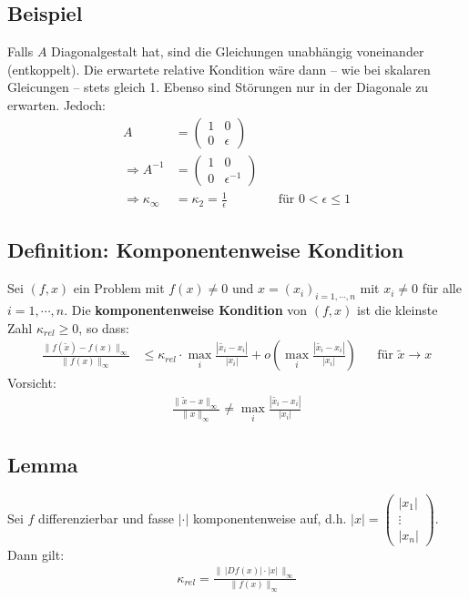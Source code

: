 \documentclass[ngerman,fontsize=11pt, paper=a4, parskip=half, titlepage=true, toc=bib]{scrbook}
\begin{document}
\subsection{Beispiel}
Falls $A$ Diagonalgestalt hat, sind die Gleichungen unabhängig voneinander (entkoppelt).
Die erwartete relative Kondition wäre dann -- wie bei skalaren Gleicungen -- stets gleich 1.
Ebenso sind Störungen nur in der Diagonale zu erwarten. Jedoch:
\begin{align*}
	A  &=\begin{pmatrix}
					1 & 0\\
					0 & \epsilon
				\end{pmatrix} \\
	\Rightarrow 	A^{-1}&=\begin{pmatrix}
													1 & 0\\
													0 & \epsilon^{-1}
												\end{pmatrix}\\
	\Rightarrow \kappa_\infty& = \kappa_2 = \frac{1}{\epsilon} 
													&& \text{für }0 < \epsilon \leq 1											
\end{align*}

\subsection{Definition: Komponentenweise Kondition}
Sei $(f, x) $ ein Problem mit $f(x)\neq 0$ und $x=(x_i)_{i=1,\cdots , n}$ mit $x_i\neq 0 $  für alle $i=1,\cdots, n$.
Die \textbf{komponentenweise Kondition} von $(f,x) $ ist die kleinste Zahl $\kappa_{rel}\geq 0$, so dass:
\begin{align*}
	\frac{\|f(\widetilde{x})-f(x)\|_\infty}{\|f(x)\|_\infty} 
				&\leq \kappa_{rel} \cdot \underset{i}{\max}\frac{|\widetilde{x_i}-x_i|}{|x_i|}+ o\left(\underset{i}{\max}\frac{|\widetilde{x_i}-x_i|}{|x_i|}\right) 
				&& \text{für }\widetilde{x}\rightarrow x
\end{align*}
Vorsicht:
\begin{gather*}
	\frac{\|\widetilde{x}-x\|_\infty}{\|x\|_\infty}\neq \underset{i}{\max}\frac{|\widetilde{x_i}-x_i|}{|x_i|}
\end{gather*}

\subsection{Lemma} \label{3.2.17}
Sei $f$ differenzierbar und fasse $|\cdot|$ komponentenweise auf, d.h. $|x| = \begin{pmatrix}
																																						|x_1| \\
																																						\vdots \\
																																						|x_n|
																																					\end{pmatrix}$.
Dann gilt:
\begin{gather}
	\kappa_{rel} = \frac{\|\, |Df(x)|\cdot |x| \, \|_\infty}{\|f(x)\|_\infty} \label{III.2.16}
\end{gather}
\end{document}
